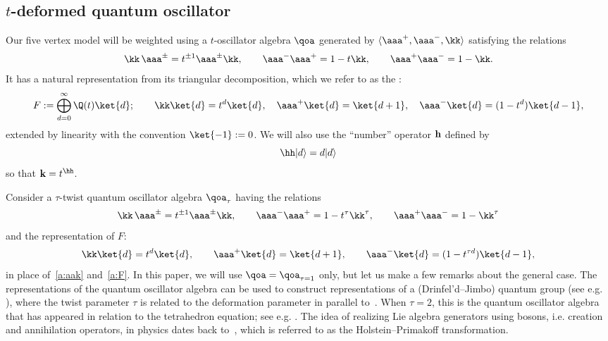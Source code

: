 \subsection{\texorpdfstring{$t$}{t}-deformed quantum oscillator}
Our five vertex model will be weighted using a $t$-oscillator algebra $\qoa$ 
generated by $\langle \aaa^+, \aaa^-, \kk \rangle$ satisfying the relations
\begin{align}\label{a:aak}
\kk \,\aaa^{\pm} = t^{\pm 1} \aaa^{\pm} \kk,
\qquad
\aaa^- \aaa^+ = 1 - t \kk,
\qquad
\aaa^+ \aaa^- = 1 - \kk.
\end{align}
It has a natural representation from its triangular decomposition, which we refer to as the :
\begin{align}\label{a:F}
F := \bigoplus_{d=0}^{\infty} \Q(t) \ket{d};
\qquad
\kk \ket{d} = t^d \ket{d},
\quad
\aaa^+ \ket{d} = \ket{d+1},
\quad
\aaa^- \ket{d} = (1 - t^d) \ket{d-1},
\end{align}
extended by linearity with the convention $\ket{-1} := 0$.
We will also use the ``number'' operator $\bf{h}$ defined by 
\begin{equation}\label{a:h}
\hh|d\rangle = d | d\rangle
\end{equation}
so that ${\bf k}= t^\hh$.
%

\begin{rema}\label{a:re:tau}
Consider a $\tau$-twist quantum oscillator algebra  
$\qoa_{\tau}$ having the relations
\begin{align}\label{a:aakt}
\kk \,\aaa^{\pm} = t^{\pm 1} \aaa^{\pm} \kk,
\qquad
\aaa^- \aaa^+ = 1 - t^{\tau} \kk^{\tau},
\qquad
\aaa^+ \aaa^- = 1 - \kk^{\tau}
\end{align}
and the representation of $F$:
\begin{align}\label{a:Ft}
\kk \ket{d} = t^d \ket{d},
\qquad
\aaa^+ \ket{d} = \ket{d+1},
\qquad
\aaa^- \ket{d} = (1 - t^{\tau d}) \ket{d-1},
\end{align}
in place of~\eqref{a:aak} and~\eqref{a:F}.
In this paper, we will use $\qoa=\qoa_{\tau = 1}$ only, but let us make a few remarks about the general case.
The representations of the quantum oscillator algebra can be used 
to construct representations of a (Drinfel'd--Jimbo) quantum group (see e.g. \cite{Hayashi90,K22}), 
where the twist parameter $\tau$ is related to the deformation parameter in parallel to~\cite{AS24}.
When $\tau = 2$, this is the quantum oscillator algebra that has appeared in relation to the tetrahedron equation; see e.g. \cite{KMO2,K22}.
The idea of realizing Lie algebra generators using bosons, i.e. creation and annihilation operators, in physics 
dates back to~\cite{HP}, which is referred to as the Holstein--Primakoff transformation.
\end{rema}


